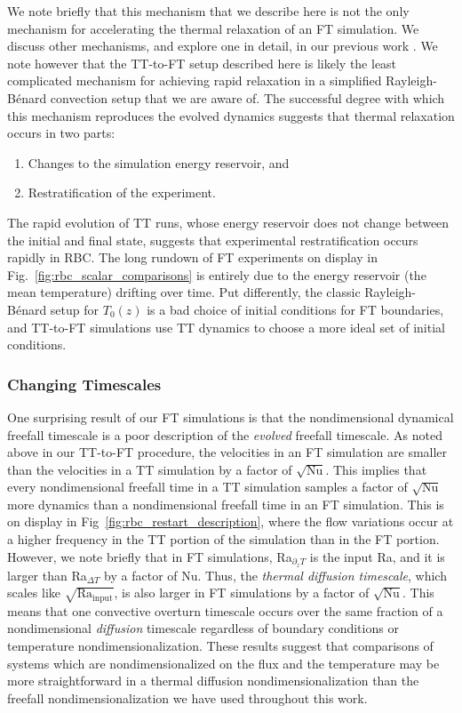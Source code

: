\documentclass[aps, pre, onecolumn, nofootinbib, notitlepage, groupedaddress, amsfonts, amssymb, amsmath, longbibliography, superscriptaddress]{revtex4-1}
\newcommand{\RB}{Rayleigh-B\'{e}nard }
\begin{document}
We note briefly that this mechanism that we describe here is not the only mechanism for accelerating the thermal relaxation of an FT simulation.
We discuss other mechanisms, and explore one in detail, in our previous work \cite{anders&all2018}.
We note however that the TT-to-FT setup described here is likely the least complicated mechanism for achieving rapid relaxation in a simplified \RB convection setup that we are aware of.
The successful degree with which this mechanism reproduces the evolved dynamics suggests that thermal relaxation occurs in two parts:
\begin{enumerate}
\item Changes to the simulation energy reservoir, and
\item Restratification of the experiment.
\end{enumerate}
The rapid evolution of TT runs, whose energy reservoir does not change between the initial and final state, suggests that experimental restratification occurs rapidly in RBC. 
The long rundown of FT experiments on display in Fig.~\ref{fig:rbc_scalar_comparisons} is entirely due to the energy reservoir (the mean temperature) drifting over time.
Put differently, the classic \RB setup for $T_0(z)$ is a bad choice of initial conditions for FT boundaries, and TT-to-FT simulations use TT dynamics to choose a more ideal set of initial conditions.


\subsubsection{Changing Timescales}
\label{sec:timescales}
One surprising result of our FT simulations is that the nondimensional dynamical freefall timescale is a poor description of the \emph{evolved} freefall timescale.
As noted above in our TT-to-FT procedure, the velocities in an FT simulation are smaller than the velocities in a TT simulation by a factor of $\sqrt{\text{Nu}}$.
This implies that every nondimensional freefall time in a TT simulation samples a factor of $\sqrt{\text{Nu}}$ more dynamics than a nondimensional freefall time in an FT simulation.
This is on display in Fig~\ref{fig:rbc_restart_description}, where the flow variations occur at a higher frequency in the TT portion of the simulation than in the FT portion.
However, we note briefly that in FT simulations, Ra$_{\partial_z T}$ is the input Ra, and it is larger than Ra$_{\Delta T}$ by a factor of $\text{Nu}$.
Thus, the \emph{thermal diffusion timescale}, which scales like $\sqrt{\text{Ra}_{\text{input}}}$, is also larger in FT simulations by a factor of $\sqrt{\text{Nu}}$.
This means that one convective overturn timescale occurs over the same fraction of a nondimensional \emph{diffusion} timescale regardless of boundary conditions or temperature nondimensionalization.
These results suggest that comparisons of systems which are nondimensionalized on the flux and the temperature may be more straightforward in a thermal diffusion nondimensionalization \cite{goluskin2015} than the freefall nondimensionalization we have used throughout this work.
\end{document}
